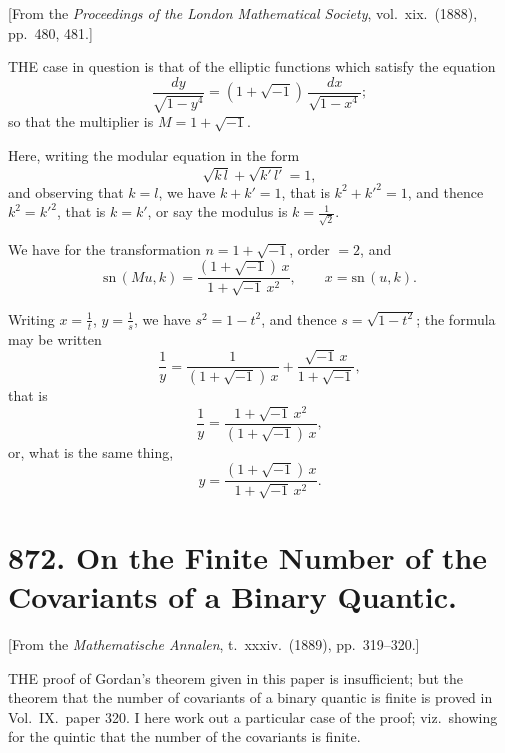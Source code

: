 \documentclass[11pt,a4paper]{book}
\providecommand{\sn}{\mathrm{sn}}
\begin{document}
[From the \textit{Proceedings of the London Mathematical Society}, vol.\ xix.\ (1888), pp.\ 480, 481.]

\medskip\noindent
THE case in question is that of the elliptic functions which satisfy the equation
\[
\frac{dy}{\sqrt{1 - y^{4}}} = (1 + \sqrt{-1})\,\frac{dx}{\sqrt{1 - x^{4}}};
\]
so that the multiplier is $M = 1 + \sqrt{-1}$.

Here, writing the modular equation in the form
\[
\sqrt{k\,l} + \sqrt{k'\,l'} = 1,
\]
and observing that $k = l$, we have $k + k' = 1$, that is $k^{2} + k'^{2} = 1$, and thence $k^{2} = k'^{2}$, that is $k = k'$, or say the modulus is $k = \frac{1}{\sqrt{2}}$.

We have for the transformation $n = 1 + \sqrt{-1}$, order $= 2$, and
\[
\sn\,(Mu, k) = \frac{(1 + \sqrt{-1})\,x}{1 + \sqrt{-1}\,x^{2}}, \qquad x = \sn\,(u, k).
\]

Writing $x = \frac{1}{t}$, $y = \frac{1}{s}$, we have $s^{2} = 1 - t^{2}$, and thence $s = \sqrt{1 - t^{2}}$; the formula may be written
\[
\frac{1}{y} = \frac{1}{(1 + \sqrt{-1})\,x} + \frac{\sqrt{-1}\,x}{1 + \sqrt{-1}},
\]
that is
\[
\frac{1}{y} = \frac{1 + \sqrt{-1}\,x^{2}}{(1 + \sqrt{-1})\,x},
\]
or, what is the same thing,
\[
y = \frac{(1 + \sqrt{-1})\,x}{1 + \sqrt{-1}\,x^{2}}.
\]

\newpage
\section[872]{872. On the Finite Number of the Covariants of a Binary Quantic.}
\label{sec:872}

[From the \textit{Mathematische Annalen}, t.\ xxxiv.\ (1889), pp.\ 319--320.]

\medskip\noindent
THE proof of Gordan's theorem given in this paper is insufficient; but the theorem that the number of covariants of a binary quantic is finite is proved in Vol.\ IX.\ paper 320. I here work out a particular case of the proof; viz.\ showing for the quintic that the number of the covariants is finite.
\end{document}
